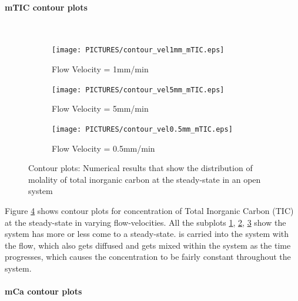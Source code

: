 \paragraph*{mTIC contour plots} \mbox{}\\
\begin{figure}[!h]
\centering
    \begin{subfigure}{.5\linewidth}
        \centering
        \texttt{[image: PICTURES/contour\_vel1mm\_mTIC.eps]}
        \caption{Flow Velocity = 1mm/min}
        \label{fig:TICSteady-state}       %
    \end{subfigure}%
    \hfill
    \begin{subfigure}{.5\linewidth}
        \centering
        \texttt{[image: PICTURES/contour\_vel5mm\_mTIC.eps]}
        \caption{Flow Velocity = 5mm/min}
        \label{fig:TICSteady-state5mm}       %
    \end{subfigure}%
    \hfill
    \begin{subfigure}{.5\linewidth}
        \centering
        \texttt{[image: PICTURES/contour\_vel0.5mm\_mTIC.eps]}
        \caption{Flow Velocity = 0.5mm/min}
        \label{fig:TICSteady-state0.5mm}       %
    \end{subfigure}%
    \caption{\DuMuX Contour plots: Numerical results that show the distribution of molality of total inorganic carbon at the steady-state in an open system}
     \label{fig:contourTIC}
\end{figure}

Figure \ref{fig:contourTIC} shows contour plots for concentration of Total Inorganic Carbon (TIC) at the steady-state in varying flow-velocities. 
All the subplots \ref{fig:TICSteady-state}, \ref{fig:TICSteady-state5mm}, \ref{fig:TICSteady-state0.5mm} show the system has more or less come to 
a steady-state.  is carried into the system with the flow, which also gets diffused and gets mixed within the system as the time 
progresses, which causes the concentration to be fairly constant throughout the system. 


\paragraph*{mCa contour plots} \mbox{}\\

